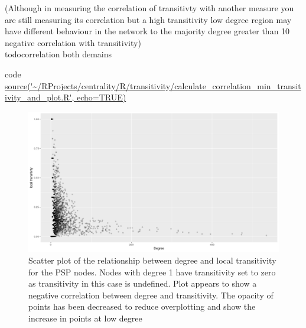 (Although in measuring the correlation of transitivty with another measure you are still measuring its correlation but a high transitivity low degree region may have different behaviour in the network to the majority degree greater than 10 negative correlation with transitivity)\\todo{correlation both demains}

code \url{source('~/RProjects/centrality/R/transitivity/calculate_correlation_min_transitivity_and_plot.R', echo=TRUE)}

\begin{figure}
    \centering
    \includegraphics[width=\textwidth]{images/Rplot02_degree_and_transitivity-change_alpha.png}
    \caption{Scatter plot of the relationship between degree and local transitivity for the PSP nodes. Nodes with degree 1 have transitivity set to zero as transitivity in this case is undefined. Plot appears to show a negative correlation between degree and transitivity. The opacity of points has been decreased to reduce overplotting and show the increase in points at low degree}
    \label{fig:Scatter plot of the relationship between degree and local transitivity for the PSP nodes}
\end{figure}
